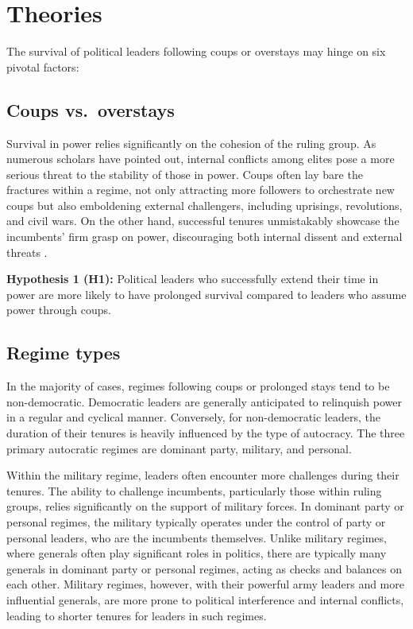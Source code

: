 \documentclass[
  12pt,
  a4paper,
  12pt]{article}
\begin{document}
\hypertarget{theories}{%
\section{Theories}\label{theories}}

The survival of political leaders following coups or overstays may hinge
on six pivotal factors:

\hypertarget{coups-vs.-overstays}{%
\subsection{Coups vs.~overstays}\label{coups-vs.-overstays}}

Survival in power relies significantly on the cohesion of the ruling
group. As numerous scholars have pointed out, internal conflicts among
elites pose a more serious threat to the stability of those in power.
Coups often lay bare the fractures within a regime, not only attracting
more followers to orchestrate new coups but also emboldening external
challengers, including uprisings, revolutions, and civil wars. On the
other hand, successful tenures unmistakably showcase the incumbents'
firm grasp on power, discouraging both internal dissent and external
threats \citep{dahl2023}.

\textbf{Hypothesis 1 (H1):} Political leaders who successfully extend
their time in power are more likely to have prolonged survival compared
to leaders who assume power through coups.

\hypertarget{regime-types}{%
\subsection{Regime types}\label{regime-types}}

In the majority of cases, regimes following coups or prolonged stays
tend to be non-democratic. Democratic leaders are generally anticipated
to relinquish power in a regular and cyclical manner. Conversely, for
non-democratic leaders, the duration of their tenures is heavily
influenced by the type of autocracy. The three primary autocratic
regimes are dominant party, military, and personal.

Within the military regime, leaders often encounter more challenges
during their tenures. The ability to challenge incumbents, particularly
those within ruling groups, relies significantly on the support of
military forces. In dominant party or personal regimes, the military
typically operates under the control of party or personal leaders, who
are the incumbents themselves. Unlike military regimes, where generals
often play significant roles in politics, there are typically many
generals in dominant party or personal regimes, acting as checks and
balances on each other. Military regimes, however, with their powerful
army leaders and more influential generals, are more prone to political
interference and internal conflicts, leading to shorter tenures for
leaders in such regimes.
\end{document}
